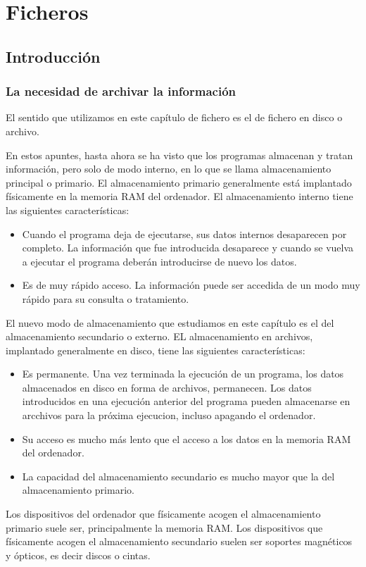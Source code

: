 \chapter{Ficheros}
\setcounter{section}{0}
\section{Introducción}
\subsection{La necesidad de archivar la información}{
El sentido que utilizamos en este capítulo de fichero es el de fichero en disco o archivo.

En estos apuntes, hasta ahora se ha visto que los programas almacenan y tratan información, pero solo de modo interno, en lo que se llama almacenamiento principal o primario. El almacenamiento primario generalmente está implantado físicamente en la memoria RAM del ordenador. El almacenamiento interno tiene las siguientes características:
\begin{itemize}
	\item Cuando el programa deja de ejecutarse, sus datos internos desaparecen por completo. La información que fue introducida desaparece y cuando se vuelva a ejecutar el programa deberán introducirse de nuevo los datos.
	\item Es de muy rápido acceso. La información puede ser accedida de un modo muy rápido para su consulta o tratamiento.
\end{itemize}
El nuevo modo de almacenamiento que estudiamos en este capítulo es el del almacenamiento secundario o externo. EL almacenamiento en archivos, implantado generalmente en disco, tiene las siguientes características:
\begin{itemize}
	\item Es permanente. Una vez terminada la ejecución de un programa, los datos almacenados en disco en forma de archivos, permanecen. Los datos introducidos en una ejecución anterior del programa pueden almacenarse en arcchivos para la próxima ejecucion, incluso apagando el ordenador.
	\item Su acceso es mucho más lento que el acceso a los datos en la memoria RAM del ordenador.
	\item La capacidad del almacenamiento secundario es mucho mayor que la del almacenamiento primario.
\end{itemize}
Los dispositivos del ordenador que físicamente acogen el almacenamiento primario suele ser, principalmente la memoria RAM. Los dispositivos que físicamente acogen el almacenamiento secundario suelen ser soportes magnéticos y ópticos, es decir discos o cintas.
}
